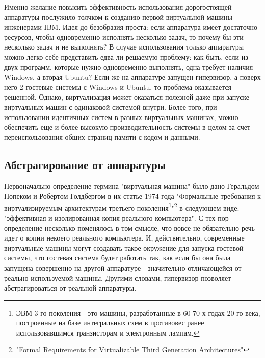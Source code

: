 \documentclass[14pt, a4paper]{article}
\begin{document}
Именно желание повысить эффективность использования дорогостоящей аппаратуры
послужило толчком к созданию первой виртуальной машины инженерами IBM. Идея до
безобразия проста: если аппаратура имеет достаточно ресурсов, чтобы одновременно
исполнять несколько задач, то почему бы эти несколько задач и не выполнять? В
случае использования только аппаратуры можно легко себе представить едва ли
решаемую проблему: как быть, если из двух программ, которые нужно одновременно
выполнять, одна требует наличия Windows, а вторая Ubuntu? Если же на аппаратуре
запущен гипервизор, а поверх него 2 гостевые системы с Windows и Ubuntu, то проблема оказывается решенной. Однако, виртуализация может оказаться полезной
даже при запуске виртуальных машин с одинаковой системой внутри. Более того, при
использовании идентичных систем в разных виртуальных машинах, можно обеспечить
еще и более высокую производительность системы в целом за счет
переиспользования общих страниц памяти с кодом и данными.

\begin{figure}[h]
    \centering
    \label{framework} 
\end{figure}

\subsection*{Абстрагирование от аппаратуры}

Первоначально определение термина "виртуальная машина" было дано Геральдом
Попеком и Робертом Голдбергом в их статье 1974 года "Формальные требования к
виртуализируемым архитектурам третьего поколения\footnote{ЭВМ 3-го поколения - это машины, разработанные в 60-70-х годах 20-го века, построенные на
базе интегральных схем в противовес ранее использовавшимся транзисторам и электронным
лампам.}"\footnote{\href{"Formal Requirements for Virtualizable Third Generation Architectures"}{"Formal Requirements for Virtualizable Third Generation Architectures"}} в следующем виде:
"эффективная и изолированная копия реального компьютера". С тех пор определение
несколько поменялось в том смысле, что вовсе не обязательно речь идет о копии
некоего реального компьютера. И, действительно, современные виртуальные машины
могут создавать такое окружение для запуска гостевой системы, что гостевая система
будет работать так, как если бы она была запущена совершенно на другой аппаратуре
- значительно отличающейся от реально используемой машины. Другими словами,
гипервизор позволяет абстрагироваться от реальной аппаратуры.
\end{document}

